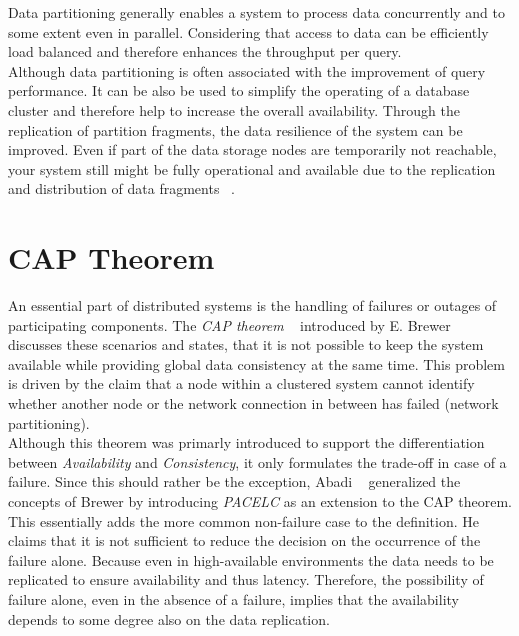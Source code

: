 Data partitioning generally enables a system to process data concurrently and 
to some extent even in parallel. Considering that access to data can be 
efficiently load balanced and therefore enhances the throughput per query.\\

Although data partitioning is often associated with the improvement of query performance.
It can be also be used to simplify the operating of a database cluster and therefore help 
to increase the overall availability.
Through the replication of partition fragments, the data resilience of the system
can be improved. Even if part of the data storage nodes are temporarily not 
reachable, your system still might be fully operational and available due to the 
replication and distribution of data fragments ~\cite{dbre2017}.







\section{CAP Theorem}
\label{sec:cap}
An essential part of distributed systems is the handling of failures or outages of participating components. 
The \emph{CAP theorem} ~\cite{cap2002} introduced by E. Brewer ~\cite{brewer:2000} discusses these scenarios and states, that it is not possible 
to keep the system available while providing global data consistency at the same time.
This problem is driven by the claim that a node within a clustered system cannot identify whether another node or the 
network connection in between has failed (network partitioning).\\
Although this theorem was primarly introduced to support the differentiation between \emph{Availability} and \emph{Consistency}, 
it only formulates the trade-off in case of a failure.
Since this should rather be the exception, Abadi ~\cite{abadi2012} generalized the concepts of Brewer by introducing \emph{PACELC} as an extension to the CAP theorem.
This essentially adds the more common non-failure case to the definition.
He claims that it is not sufficient to reduce the decision on the occurrence of the failure alone. 
Because even in high-available environments the data needs to be replicated to ensure availability and thus latency. 
Therefore, the possibility of failure alone, even in the absence of a failure, implies that the availability depends to some degree also on the data replication.


